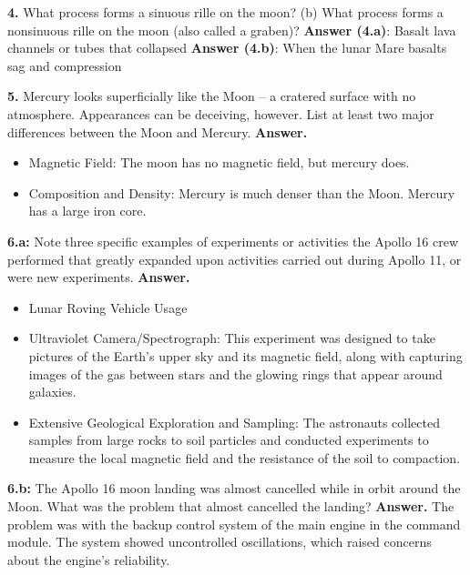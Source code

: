 \documentclass{report}
\begin{document}
    \bigbreak \noindent 
    \textbf{4.} What process forms a sinuous rille on the moon? (b) What process forms a nonsinuous rille on the moon (also called a graben)?
    \bigbreak \noindent 
    \textbf{Answer (4.a)}: Basalt lava channels or tubes that collapsed 
    \bigbreak \noindent 
    \textbf{Answer (4.b)}: When the lunar Mare basalts sag and compression 

    \bigbreak \noindent 
    \textbf{5.} Mercury looks superficially like the Moon -- a cratered surface with no atmosphere. Appearances can be deceiving, however. List at least two major differences between the Moon and Mercury.
    \bigbreak \noindent 
    \textbf{Answer.}
    \begin{itemize}
        \item Magnetic Field: The moon has no magnetic field, but mercury does.
        \item Composition and Density: Mercury is much denser than the Moon. Mercury has a large iron core. 
    \end{itemize}

    \bigbreak \noindent 
    \textbf{6.a:} Note three specific examples of experiments or activities the Apollo 16 crew performed that greatly expanded upon activities carried out during Apollo 11, or were new experiments. 
    \bigbreak \noindent 
    \textbf{Answer.}
    \begin{itemize}
        \item Lunar Roving Vehicle Usage
        \item Ultraviolet Camera/Spectrograph: This experiment was designed to take pictures of the Earth's upper sky and its magnetic field, along with capturing images of the gas between stars and the glowing rings that appear around galaxies.
        \item Extensive Geological Exploration and Sampling: The astronauts collected samples from large rocks to soil particles and conducted experiments to measure the local magnetic field and the resistance of the soil to compaction.
    \end{itemize}

    \bigbreak \noindent 
    \textbf{6.b:} The Apollo 16 moon landing was almost cancelled while in orbit around the Moon. What was the problem that almost cancelled the landing?
    \bigbreak \noindent 
    \textbf{Answer.} The problem was with the backup control system of the main engine in the command module. The system showed uncontrolled oscillations, which raised concerns about the engine's reliability.
\end{document}
